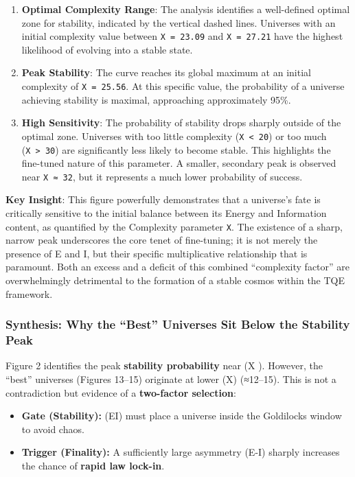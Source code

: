 \begin{enumerate}
\def\labelenumi{\arabic{enumi}.}
\item
  \textbf{Optimal Complexity Range}: The analysis identifies a
  well-defined optimal zone for stability, indicated by the vertical
  dashed lines. Universes with an initial complexity value between
  \texttt{X\ =\ 23.09} and \texttt{X\ =\ 27.21} have the highest
  likelihood of evolving into a stable state.
\item
  \textbf{Peak Stability}: The curve reaches its global maximum at an
  initial complexity of \texttt{X\ =\ 25.56}. At this specific value,
  the probability of a universe achieving stability is maximal,
  approaching approximately 95\%.
\item
  \textbf{High Sensitivity}: The probability of stability drops sharply
  outside of the optimal zone. Universes with too little complexity
  (\texttt{X\ \textless{}\ 20}) or too much
  (\texttt{X\ \textgreater{}\ 30}) are significantly less likely to
  become stable. This highlights the fine-tuned nature of this
  parameter. A smaller, secondary peak is observed near
  \texttt{X\ ≈\ 32}, but it represents a much lower probability of
  success.
\end{enumerate}

\textbf{Key Insight}: This figure powerfully demonstrates that a
universe's fate is critically sensitive to the initial balance between
its Energy and Information content, as quantified by the Complexity
parameter \texttt{X}. The existence of a sharp, narrow peak underscores
the core tenet of fine-tuning; it is not merely the presence of E and I,
but their specific multiplicative relationship that is paramount. Both
an excess and a deficit of this combined ``complexity factor'' are
overwhelmingly detrimental to the formation of a stable cosmos within
the TQE framework.

\subsubsection{Synthesis: Why the ``Best'' Universes Sit Below the
Stability
Peak}\label{synthesis-why-the-best-universes-sit-below-the-stability-peak}

Figure 2 identifies the peak \textbf{stability probability} near (X
). However, the ``best'' universes (Figures 13--15)
originate at lower (X) (≈12--15). This is not a contradiction but
evidence of a \textbf{two-factor selection}:

\begin{itemize}
\tightlist
\item
  \textbf{Gate (Stability):} (E\cdot I) must place a universe inside the
  Goldilocks window to avoid chaos.
\item
  \textbf{Trigger (Finality):} A sufficiently large asymmetry
  (\textbar E-I\textbar) sharply increases the chance of \textbf{rapid
  law lock-in}.
\end{itemize}

